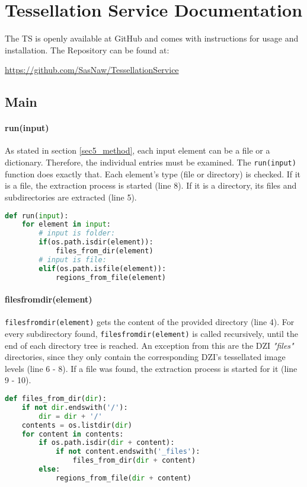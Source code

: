 \chapter{Tessellation Service Documentation}
\label{secC}
The TS is openly available at GitHub and comes with instructions for usage and installation. The Repository can be found at:

\url{https://github.com/SasNaw/TessellationService}

\section{Main}

\subsubsection{run(input)}
As stated in section \ref{sec5_method}, each input element can be a file or a dictionary. Therefore, the individual entries must be examined. The \texttt{run(input)} function does exactly that. Each element's type (file or directory) is checked. If it is a file, the extraction process is started (line 8). If it is a directory, its files and subdirectories are extracted (line 5).

\begin{lstlisting}[frame=single,language=python]
def run(input):
	for element in input:
		# input is folder:
		if(os.path.isdir(element)):
			files_from_dir(element)
		# input is file:
		elif(os.path.isfile(element)):
			regions_from_file(element)
\end{lstlisting}


\subsubsection{files{\textunderscore}from{\textunderscore}dir(element)}
\texttt{files{\textunderscore}from{\textunderscore}dir(element)} gets the content of the provided directory (line 4). For every subdirectory found, \texttt{files{\textunderscore}from{\textunderscore}dir(element)} is called recursively, until the end of each directory tree is reached. An exception from this are the DZI \emph{"{\textunderscore}files"} directories, since they only contain the corresponding DZI's tessellated image levels (line 6 - 8). If a file was found, the extraction process is started for it (line 9 - 10).

\begin{lstlisting}[frame=single,language=python]
def files_from_dir(dir):
	if not dir.endswith('/'):
		dir = dir + '/'
	contents = os.listdir(dir)
	for content in contents:
		if os.path.isdir(dir + content):
			if not content.endswith('_files'):
				files_from_dir(dir + content)
		else:
			regions_from_file(dir + content)
\end{lstlisting}


